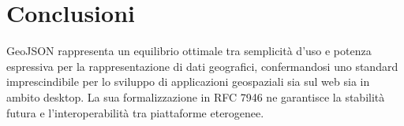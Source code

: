 \section{Conclusioni}
GeoJSON rappresenta un equilibrio ottimale tra semplicità d'uso e potenza espressiva per la rappresentazione di dati geografici, confermandosi uno standard imprescindibile per lo sviluppo di applicazioni geospaziali sia sul web sia in ambito desktop. La sua formalizzazione in RFC 7946 ne garantisce la stabilità futura e l'interoperabilità tra piattaforme eterogenee.
